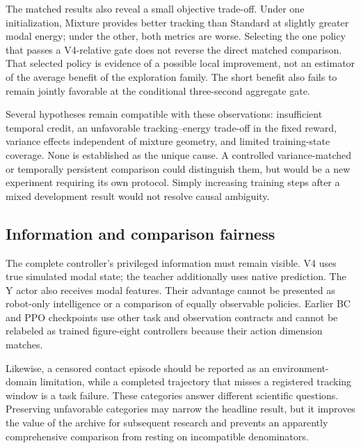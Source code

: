The matched results also reveal a small objective trade-off. Under one initialization, Mixture provides better tracking than Standard at slightly greater modal energy; under the other, both metrics are worse. Selecting the one policy that passes a V4-relative gate does not reverse the direct matched comparison. That selected policy is evidence of a possible local improvement, not an estimator of the average benefit of the exploration family. The short benefit also fails to remain jointly favorable at the conditional three-second aggregate gate.

Several hypotheses remain compatible with these observations: insufficient temporal credit, an unfavorable tracking--energy trade-off in the fixed reward, variance effects independent of mixture geometry, and limited training-state coverage. None is established as the unique cause. A controlled variance-matched or temporally persistent comparison could distinguish them, but would be a new experiment requiring its own protocol. Simply increasing training steps after a mixed development result would not resolve causal ambiguity.

\subsection{Information and comparison fairness}
The complete controller's privileged information must remain visible. V4 uses true simulated modal state; the teacher additionally uses native prediction. The Y actor also receives modal features. Their advantage cannot be presented as robot-only intelligence or a comparison of equally observable policies. Earlier BC and PPO checkpoints use other task and observation contracts and cannot be relabeled as trained figure-eight controllers because their action dimension matches.

Likewise, a censored contact episode should be reported as an environment-domain limitation, while a completed trajectory that misses a registered tracking window is a task failure. These categories answer different scientific questions. Preserving unfavorable categories may narrow the headline result, but it improves the value of the archive for subsequent research and prevents an apparently comprehensive comparison from resting on incompatible denominators.
